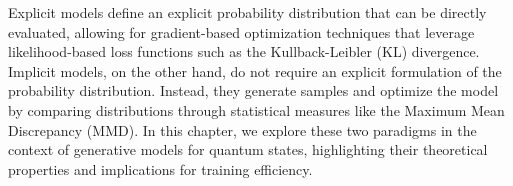 Explicit models define an explicit probability distribution that can be directly evaluated, allowing for gradient-based optimization techniques that leverage likelihood-based loss functions such as the Kullback-Leibler (KL) divergence. Implicit models, on the other hand, do not require an explicit formulation of the probability distribution. Instead, they generate samples and optimize the model by comparing distributions through statistical measures like the Maximum Mean Discrepancy (MMD). In this chapter, we explore these two paradigms in the context of generative models for quantum states, highlighting their theoretical properties and implications for training efficiency.
